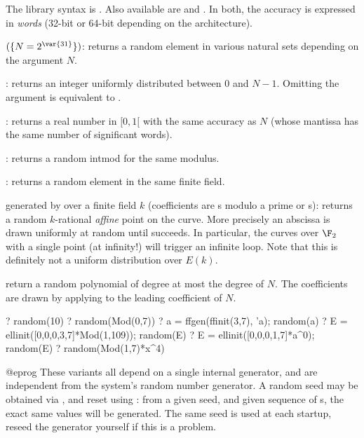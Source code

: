 The library syntax is .
Also available are  and
. In both, the accuracy is expressed in
\emph{words} (32-bit or 64-bit depending on the architecture).

$(\{N=2^{\var{31}}\})$: \label{se:random}
returns a random element in various natural sets depending on the
argument $N$.

\item {}: returns an integer
uniformly distributed between $0$ and $N-1$. Omitting the argument
is equivalent to .

\item {}: returns a real number in $[0,1[$ with the same accuracy as
$N$ (whose mantissa has the same number of significant words).

\item {}: returns a random intmod for the same modulus.

\item {}: returns a random element in the same finite field.

\item {} generated by  over a finite field $k$
(coefficients are s modulo a prime or s): returns a
random $k$-rational \emph{affine} point on the curve. More precisely an
abscissa is drawn uniformly at random until  succeeds.
In particular, the curves over $\F_2$ with a single point (at infinity!)
will trigger an infinite loop. Note that this is definitely not a uniform
distribution over $E(k)$.

\item {} return a random polynomial of degree at most the degree of $N$.
The coefficients are drawn by applying  to the leading
coefficient of $N$.

\bprog
? random(10)
? random(Mod(0,7))
? a = ffgen(ffinit(3,7), 'a); random(a)
? E = ellinit([0,0,0,3,7]*Mod(1,109)); random(E)
? E = ellinit([0,0,0,1,7]*a^0); random(E)
? random(Mod(1,7)*x^4)

@eprog
These variants all depend on a single internal generator, and are
independent from the system's random number generator.
A random seed may be obtained via , and reset
using : from a given seed, and given sequence of s,
the exact same values will be generated. The same seed is used at each
startup, reseed the generator yourself if this is a problem.

